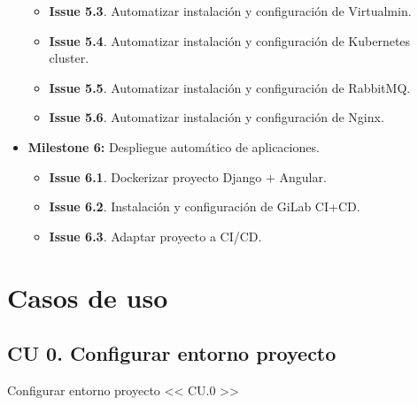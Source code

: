 \begin{text}
\begin{itemize}
\begin{itemize}
					\item \textbf{Issue 5.3}. Automatizar instalación y configuración de Virtualmin.
					\item \textbf{Issue 5.4}. Automatizar instalación y configuración de Kubernetes cluster.
					\item \textbf{Issue 5.5}. Automatizar instalación y configuración de RabbitMQ.
					\item \textbf{Issue 5.6}. Automatizar instalación y configuración de Nginx.
				\end{itemize}
			\item \textbf{Milestone 6:} Despliegue automático de aplicaciones.
				\begin{itemize}
					\item \textbf{Issue 6.1}. Dockerizar proyecto Django + Angular.
					\item \textbf{Issue 6.2}. Instalación y configuración de GiLab CI+CD.
					\item \textbf{Issue 6.3}. Adaptar proyecto a CI/CD.
				\end{itemize}
		\end{itemize}
	\end{text}

\clearpage
\section{Casos de uso}
	\subsection{CU 0. Configurar entorno proyecto}
	\begin{usecase}{Configurar entorno proyecto << CU.0 >>}
		
		
		
		
		\hline
	\end{usecase}
	\clearpage
